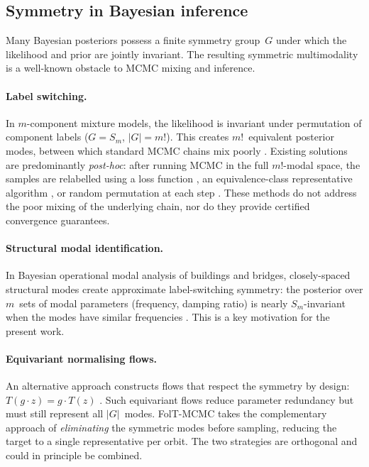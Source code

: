 \subsection{Symmetry in Bayesian inference}
\label{sec:bg_symmetry}

Many Bayesian posteriors possess a finite symmetry group~$G$
under which the likelihood and prior are jointly invariant.
The resulting symmetric multimodality is a well-known
obstacle to MCMC mixing and inference.

\paragraph{Label switching.}
In $m$-component mixture models, the likelihood is invariant
under permutation of component labels ($G = S_m$,
$|G| = m!$).  This creates $m!$~equivalent posterior
modes, between which standard MCMC chains mix poorly
\citep{Celeux2000,Jasra2005}.  Existing solutions are
predominantly \emph{post-hoc}: after running MCMC in
the full $m!$-modal space, the samples are relabelled
using a loss function \citep{Stephens2000}, an
equivalence-class representative algorithm
\citep{Papastamoulis2010}, or random permutation at each
step \citep{FruhwirthSchnatter2001}.  These methods do not
address the poor mixing of the underlying chain, nor do they
provide certified convergence guarantees.

\paragraph{Structural modal identification.}
In Bayesian operational modal analysis of buildings and bridges,
closely-spaced structural modes create approximate label-switching
symmetry: the posterior over $m$~sets of modal parameters
(frequency, damping ratio) is nearly $S_m$-invariant when the
modes have similar frequencies \citep{Au2011,YangLamBeck2019}.
This is a key motivation for the present work.

\paragraph{Equivariant normalising flows.}
An alternative approach constructs flows that respect the
symmetry by design: $T(g \cdot z) = g \cdot T(z)$
\citep{Kohler2020,Rezende2019}.  Such equivariant flows reduce
parameter redundancy but must still represent all $|G|$~modes.
FolT-MCMC takes the complementary approach of
\emph{eliminating} the symmetric modes before sampling,
reducing the target to a single representative per orbit.
The two strategies are orthogonal and could in principle be
combined.
